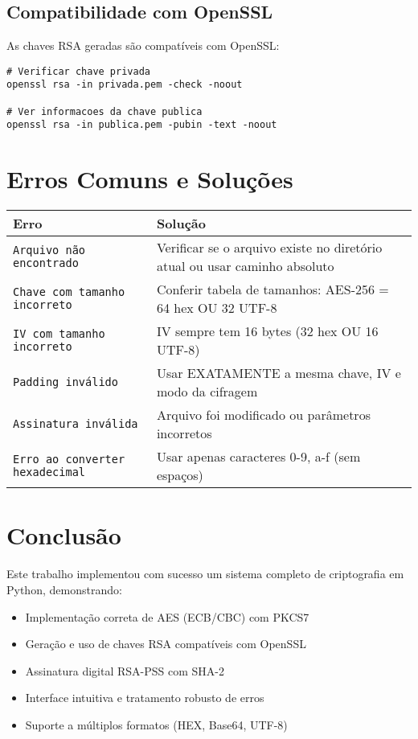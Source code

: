 \documentclass[12pt,a4paper]{article}
\begin{document}
\subsection{Compatibilidade com OpenSSL}

As chaves RSA geradas são compatíveis com OpenSSL:

\begin{lstlisting}[style=bashstyle,caption={Verificar chaves geradas}]
# Verificar chave privada
openssl rsa -in privada.pem -check -noout

# Ver informacoes da chave publica
openssl rsa -in publica.pem -pubin -text -noout
\end{lstlisting}

\section{Erros Comuns e Soluções}

\begin{table}[h]
\centering
\small
\begin{tabular}{|p{5.5cm}|p{6cm}|}
\hline
\rowcolor{primaryblue!20}
\textbf{Erro} & \textbf{Solução} \\ \hline
\texttt{Arquivo não encontrado} & Verificar se o arquivo existe no diretório atual ou usar caminho absoluto \\ \hline
\texttt{Chave com tamanho incorreto} & Conferir tabela de tamanhos: AES-256 = 64 hex OU 32 UTF-8 \\ \hline
\texttt{IV com tamanho incorreto} & IV sempre tem 16 bytes (32 hex OU 16 UTF-8) \\ \hline
\texttt{Padding inválido} & Usar EXATAMENTE a mesma chave, IV e modo da cifragem \\ \hline
\texttt{Assinatura inválida} & Arquivo foi modificado ou parâmetros incorretos \\ \hline
\texttt{Erro ao converter hexadecimal} & Usar apenas caracteres 0-9, a-f (sem espaços) \\ \hline
\end{tabular}
\end{table}

\section{Conclusão}

Este trabalho implementou com sucesso um sistema completo de criptografia em Python, demonstrando:

\begin{itemize}[leftmargin=*]
    \item[\faStar] Implementação correta de AES (ECB/CBC) com PKCS7
    \item[\faStar] Geração e uso de chaves RSA compatíveis com OpenSSL
    \item[\faStar] Assinatura digital RSA-PSS com SHA-2
    \item[\faStar] Interface intuitiva e tratamento robusto de erros
    \item[\faStar] Suporte a múltiplos formatos (HEX, Base64, UTF-8)
\end{itemize}
\end{document}
